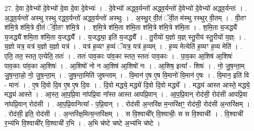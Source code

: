 \documentclass[17pt]{extarticle}
\begin{document}
27. दे॒वा दे॒वेभ्यो॑ दे॒वेभ्यो॑ दे॒वा दे॒वा दे॒वेभ्यः॑ । . दे॒वेभ्यो॑ अद्ध्व॒र्यन्तो॑ अद्ध्व॒र्यन्तो॑ दे॒वेभ्यो॑ दे॒वेभ्यो॑ अद्ध्व॒र्यन्तः॑ । . अ॒द्ध्व॒र्यन्तो॑ अस्थु रस्थु रद्ध्व॒र्यन्तो॑ अद्ध्व॒र्यन्तो॑ अस्थुः । . अ॒स्थु॒र् वी॒तं ॅवी॒त म॑स्थु रस्थुर् वी॒तम् । . वी॒तꣳ श॑मि॒त्रे श॑मि॒त्रे वी॒तं ॅवी॒तꣳ श॑मि॒त्रे । . श॒मि॒त्रे श॑मि॒ता श॑मि॒ता श॑मि॒त्रे श॑मि॒त्रे श॑मि॒ता । . श॒मि॒ता य॒जद्ध्यै॑ य॒जद्ध्यै॑ शमि॒ता श॑मि॒ता य॒जद्ध्यै᳚ । . य॒जद्ध्या॒ इति॑ य॒जद्ध्यै᳚ । . तु॒रीयो॑ य॒ज्ञो य॒ज्ञ् स्तु॒रीय॑ स्तु॒रीयो॑ य॒ज्ञ्ः । . य॒ज्ञो यत्र॒ यत्र॑ य॒ज्ञो य॒ज्ञो यत्र॑ । . यत्र॑ ह॒व्यꣳ ह॒व्यं ॅयत्र॒ यत्र॑ ह॒व्यम् । . ह॒व्य मेत्येति॑ ह॒व्यꣳ ह॒व्य मेति॑ । . एति॒ तत॒ स्तत॒ एत्येति॒ ततः॑ । . ततः॑ पाव॒काः पा॑व॒का स्तत॒ स्ततः॑ पाव॒काः । . पा॒व॒का आ॒शिष॑ आ॒शिषः॑ पाव॒काः पा॑व॒का आ॒शिषः॑ । . आ॒शिषो॑ नो न आ॒शिष॑ आ॒शिषो॑ नः । . आ॒शिष॒ इत्या᳚ - शिषः॑ । . नो॒ जु॒ष॒न्ता॒म् जु॒ष॒न्ता॒न्नो॒ नो॒ जु॒ष॒न्ता॒म् । . जु॒ष॒न्ता॒मिति॑ जुषन्ताम् । . वि॒मान॑ ए॒ष ए॒ष वि॒मानो॑ वि॒मान॑ ए॒षः । . वि॒मान॒ इति॑ वि - मानः॑ । . ए॒ष दि॒वो दि॒व ए॒ष ए॒ष दि॒वः । . दि॒वो मद्ध्ये॒ मद्ध्ये॑ दि॒वो दि॒वो मद्ध्ये᳚ । . मद्ध्य॑ आस्त आस्ते॒ मद्ध्ये॒ मद्ध्य॑ आस्ते । . आ॒स्त॒ आ॒प॒प्रि॒वा ना॑पप्रि॒वा ना᳚स्त आस्त आपप्रि॒वान् । . आ॒प॒प्रि॒वान् रोद॑सी॒ रोद॑सी आपप्रि॒वा ना॑पप्रि॒वान् रोद॑सी । . आ॒प॒प्रि॒वानित्या᳚ - प॒प्रि॒वान् । . रोद॑सी अ॒न्तरि॑क्ष म॒न्तरि॑क्षꣳ॒॒ रोद॑सी॒ रोद॑सी अ॒न्तरि॑क्षम् । . रोद॑सी॒ इति॒ रोद॑सी । . अ॒न्तरि॑क्ष॒मित्य॒न्तरि॑क्षम् । . स वि॒श्वाची᳚र् वि॒श्वाचीः॒ स स वि॒श्वाचीः᳚ । . वि॒श्वाची॑ र॒भ्य॑भि वि॒श्वाची᳚र् वि॒श्वाची॑ र॒भि । . अ॒भि च॑ष्टे चष्टे अ॒भ्य॑भि च॑ष्टे । \newline
\end{document}
